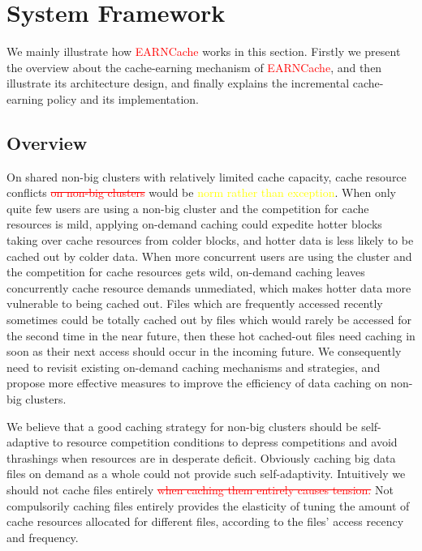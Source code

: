 \renewcommand{\algorithmicrequire}{\textbf{Input:}}
\renewcommand{\algorithmicensure}{\textbf{Output:}}

\section{System Framework}\label{sec:SDI}
We mainly illustrate how \textcolor{red}{EARNCache} works in this section. Firstly we present the overview about the cache-earning mechanism of \textcolor{red}{EARNCache}, and then illustrate its architecture design, and finally explains the incremental cache-earning policy and its implementation.

\subsection{Overview}\label{sec:overview}

On shared non-big clusters with relatively limited cache capacity, cache resource conflicts \textcolor{red}{\sout{on non-big clusters}} would be \textcolor{yellow}{norm rather than exception}. When only quite few users are using a non-big cluster and the competition for cache resources is mild, applying on-demand caching could expedite hotter blocks taking over cache resources from colder blocks, and hotter data is less likely to be cached out by colder data. When more concurrent users are using the cluster and the competition for cache resources gets wild, on-demand caching leaves concurrently cache resource demands unmediated, which makes hotter data more vulnerable to being cached out. Files which are frequently accessed recently sometimes could be totally cached out by files which would rarely be accessed for the second time in the near future, then these hot cached-out files need caching in soon as their next access should occur in the incoming future. We consequently need to revisit existing on-demand caching mechanisms and strategies, and propose more effective measures to improve the efficiency of data caching on non-big clusters.

We believe that a good caching strategy for non-big clusters should be self-adaptive to resource competition conditions to depress competitions and avoid thrashings when resources are in desperate deficit. Obviously caching big data files on demand as a whole could not provide such self-adaptivity. Intuitively we should not cache files entirely \textcolor{red}{\sout{when caching them entirely causes tension. }}
Not compulsorily caching files entirely provides the elasticity of tuning the amount of cache resources allocated for different files, according to the files' access recency and frequency.

